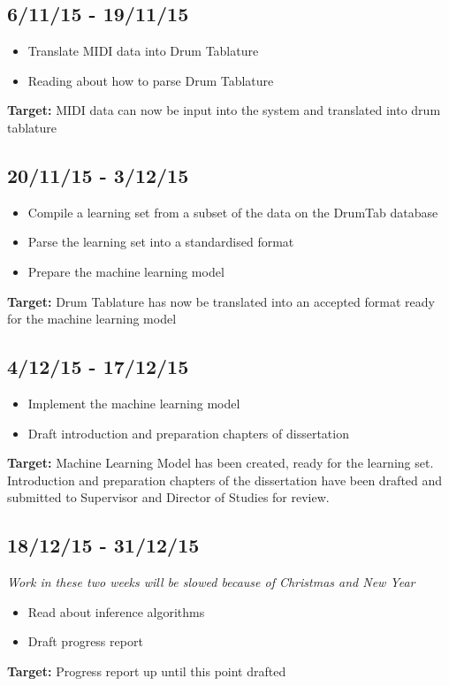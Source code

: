 \documentclass[12pt,a4]{article}
\begin{document}
        \subsection{6/11/15 - 19/11/15}
        \begin{itemize}
            \item Translate MIDI data into Drum Tablature
            \item Reading about how to parse Drum Tablature
        \end{itemize}
{\bf Target:} MIDI data can now be input into the system and translated into drum tablature
        \subsection{20/11/15 - 3/12/15}
        \begin{itemize}
            \item Compile a learning set from a subset of the data on the DrumTab database
            \item Parse the learning set into a standardised format
            \item Prepare the machine learning model
        \end{itemize}
{\bf Target:} Drum Tablature has now be translated into an accepted format ready for the machine learning model
        \subsection{4/12/15 - 17/12/15}
\begin{itemize}
        \item Implement the machine learning model
        \item Draft introduction and preparation chapters of dissertation
        \end{itemize}
{\bf Target:} Machine Learning Model has been created, ready for the learning set. Introduction and preparation chapters of the dissertation have been drafted and submitted to Supervisor and Director of Studies for review.
        \subsection{18/12/15 - 31/12/15}
\emph{Work in these two weeks will be slowed because of Christmas and New Year}
\begin{itemize}
        \item Read about inference algorithms
        \item Draft progress report
\end{itemize}
{\bf Target:} Progress report up until this point drafted
\end{document}
